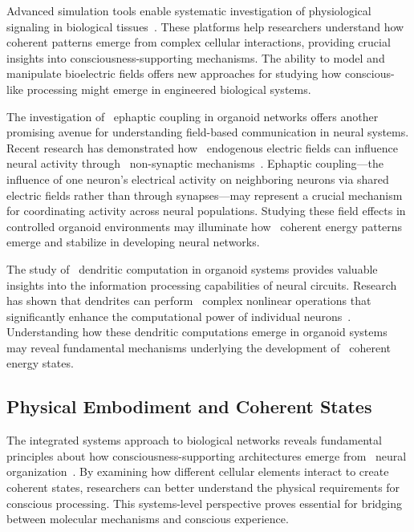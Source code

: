 Advanced simulation tools enable systematic investigation of physiological signaling in biological tissues~\cite{Pietak2017, ruffini2020realistic}. These platforms help researchers understand how coherent patterns emerge from complex cellular interactions, providing crucial insights into consciousness-supporting mechanisms. The ability to model and manipulate bioelectric fields offers new approaches for studying how conscious-like processing might emerge in engineered biological systems.

The investigation of~ ephaptic coupling in organoid networks offers another promising avenue for understanding field-based communication in neural systems. Recent research has demonstrated how~ endogenous electric fields can influence neural activity through~ non-synaptic mechanisms~\cite{anastassiou2015ephaptic, chiang2019slow}. Ephaptic coupling—the influence of one neuron's electrical activity on neighboring neurons via shared electric fields rather than through synapses—may represent a crucial mechanism for coordinating activity across neural populations. Studying these field effects in controlled organoid environments may illuminate how~ coherent energy patterns emerge and stabilize in developing neural networks.

The study of~ dendritic computation in organoid systems provides valuable insights into the information processing capabilities of neural circuits. Research has shown that dendrites can perform~ complex nonlinear operations that significantly enhance the computational power of individual neurons~\cite{Gidon2020, Beniaguev2021}. Understanding how these dendritic computations emerge in organoid systems may reveal fundamental mechanisms underlying the development of~ coherent energy states.

\subsection*{Physical Embodiment and Coherent States}

The integrated systems approach to biological networks reveals fundamental principles about how consciousness-supporting architectures emerge from~ neural organization~\cite{Zhang2016, bullmore2012economy}. By examining how different cellular elements interact to create~ coherent states, researchers can better understand the physical requirements for conscious processing. This systems-level perspective proves essential for bridging between molecular mechanisms and conscious experience.

